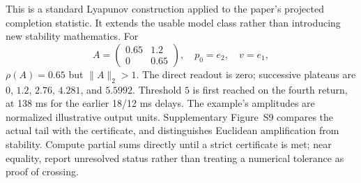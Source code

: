 This is a standard Lyapunov construction applied to the paper's projected completion statistic. It extends the usable model class rather than introducing new stability mathematics. For
\[
A=\begin{pmatrix}0.65&1.2\\0&0.65\end{pmatrix},\quad
p_0=e_2,\quad v=e_1,
\]
$\rho(A)=0.65$ but $\|A\|_2>1$. The direct readout is zero; successive plateaus are $0$, $1.2$, $2.76$, $4.281$, and $5.5992$. Threshold $5$ is first reached on the fourth return, at 138 ms for the earlier 18/12 ms delays. The example's amplitudes are normalized illustrative output units. Supplementary Figure~S9 compares the actual tail with the certificate, and distinguishes Euclidean amplification from stability. Compute partial sums directly until a strict certificate is met; near equality, report unresolved status rather than treating a numerical tolerance as proof of crossing.
